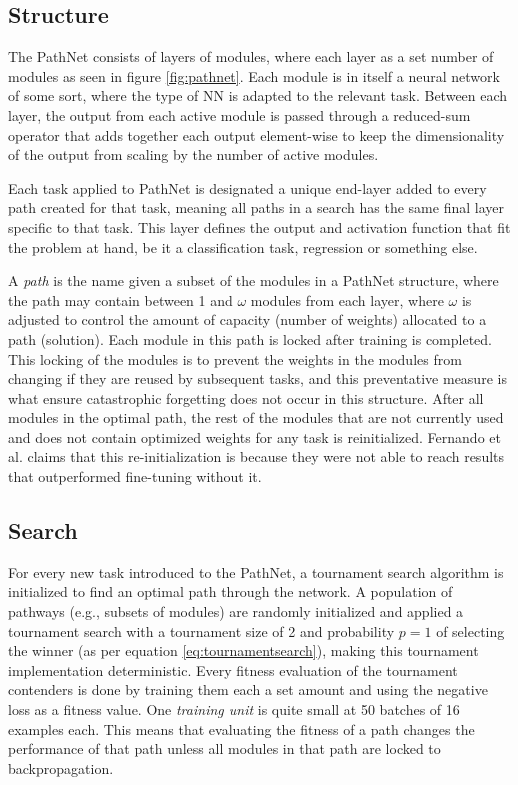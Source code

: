 \subsection{Structure}
The PathNet consists of layers of modules, where each layer as a set number of modules as seen in figure \ref{fig:pathnet}. Each module is in itself a neural network of some sort, where the type of NN is adapted to the relevant task. Between each layer, the output from each active module is passed through a reduced-sum operator that adds together each output element-wise to keep the dimensionality of the output from scaling by the number of active modules. 

Each task applied to PathNet is designated a unique end-layer added to every path created for that task, meaning all paths in a search has the same final layer specific to that task. This layer defines the output and activation function that fit the problem at hand, be it a classification task, regression or something else.  

A \textit{path} is the name given a subset of the modules in a PathNet structure, where the path may contain between 1 and \(\omega\) modules from each layer, where \(\omega\) is adjusted to control the amount of capacity (number of weights) allocated to a path (solution). Each module in this path is locked after training is completed. This locking of the modules is to prevent the weights in the modules from changing if they are reused by subsequent tasks, and this preventative measure is what ensure catastrophic forgetting does not occur in this structure. After all modules in the optimal path, the rest of the modules that are not currently used and does not contain optimized weights for any task is reinitialized. Fernando et al. claims\cite{pathnet} that this re-initialization is because they were not able to reach results that outperformed fine-tuning without it.

\subsection{Search}\label{background:pathnet.search}
For every new task introduced to the PathNet, a tournament search algorithm is initialized to find an optimal path through the network. A population of pathways (e.g., subsets of modules) are randomly initialized and applied a tournament search with a tournament size of 2 and probability \(p=1\) of selecting the winner (as per equation \ref{eq:tournamentsearch}), making this tournament implementation deterministic. Every fitness evaluation of the tournament contenders is done by training them each a set amount and using the negative loss as a fitness value. One \textit{training unit} is quite small at 50 batches of 16 examples each. This means that evaluating the fitness of a path changes the performance of that path unless all modules in that path are locked to backpropagation.

